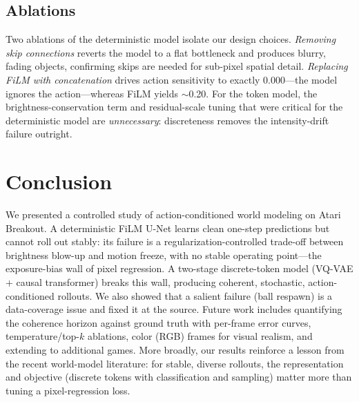 \documentclass[10pt,twocolumn,letterpaper]{article}
\begin{document}
\subsection{Ablations}
Two ablations of the deterministic model isolate our design choices.
\emph{Removing skip connections} reverts the model to a flat bottleneck and
produces blurry, fading objects, confirming skips are needed for sub-pixel
spatial detail. \emph{Replacing FiLM with concatenation} drives action
sensitivity to exactly $0.000$---the model ignores the action---whereas FiLM
yields $\sim$0.20. For the token model, the brightness-conservation term and
residual-scale tuning that were critical for the deterministic model are
\emph{unnecessary}: discreteness removes the intensity-drift failure outright.

\section{Conclusion}
We presented a controlled study of action-conditioned world modeling on Atari
Breakout. A deterministic FiLM U-Net learns clean one-step predictions but cannot
roll out stably: its failure is a regularization-controlled trade-off between
brightness blow-up and motion freeze, with no stable operating point---the
exposure-bias wall of pixel regression. A two-stage discrete-token model
(VQ-VAE + causal transformer) breaks this wall, producing coherent, stochastic, action-conditioned rollouts. We also
showed that a salient failure (ball respawn) is a data-coverage issue and fixed it
at the source. Future work includes quantifying the coherence horizon against
ground truth with per-frame error curves, temperature/top-$k$ ablations, color
(RGB) frames for visual realism, and extending to additional games. More broadly,
our results reinforce a lesson from the recent world-model literature: for stable,
diverse rollouts, the representation and objective (discrete tokens with
classification and sampling) matter more than tuning a pixel-regression loss.

{\small


}
\end{document}
